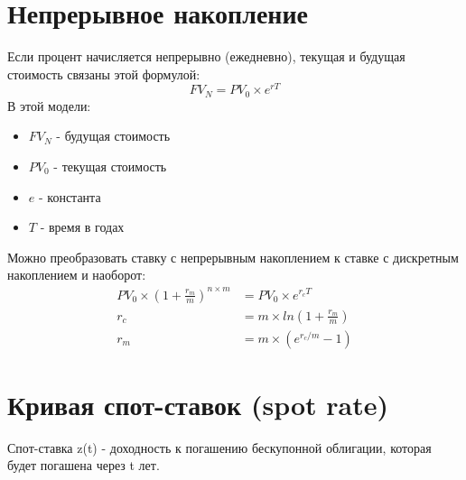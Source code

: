 \documentclass{article}
\begin{document}
\section{Непрерывное накопление}
Если процент начисляется непрерывно (ежедневно), текущая и будущая стоимость связаны этой формулой:
\begin{equation*}
    FV_N = PV_0\times e^{rT}
\end{equation*}
В этой модели:
\begin{itemize}
    \item $FV_N$ - будущая стоимость
    \item $PV_0$ - текущая стоимость
    \item $e$ - константа
    \item $T$ - время в годах
\end{itemize}
Можно преобразовать ставку с непрерывным накоплением к ставке с дискретным накоплением и наоборот:
\begin{align*}
    PV_0\times(1+\frac{r_m}{m})^{n\times m} &= PV_0\times e^{r_cT}
    \\
    r_c &= m\times ln(1+\frac{r_m}{m})
    \\
    r_m &= m\times (e^{r_c/m}-1)
\end{align*}

\section{Кривая спот-ставок (spot rate)}

Спот-ставка z(t) - доходность к погашению бескупонной облигации, которая будет погашена через t лет.
\end{document}
